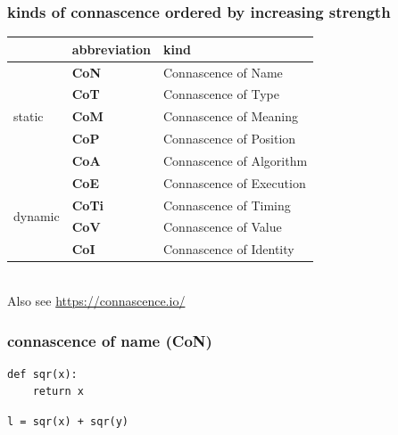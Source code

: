 \documentclass[aspectratio=169,12pt,xcolor=dvipsnames]{beamer}
\begin{document}
\begin{frame}
  \frametitle{kinds of connascence ordered by increasing strength}
  \begin{center}
    \begin{tabular}{|l|l|l|}\hline
      & \textbf{abbreviation}  & \textbf{kind} \\\hline
      \multirow{5}{*}{static}  & \textbf{CoN}  & Connascence of Name\\
      & \textbf{CoT}  & Connascence of Type\\
      & \textbf{CoM}  & Connascence of Meaning\\
      & \textbf{CoP}  & Connascence of Position\\
      & \textbf{CoA}  & Connascence of Algorithm\\\hline
      \multirow{4}{*}{dynamic} & \textbf{CoE}  & Connascence of Execution\\
      & \textbf{CoTi} & Connascence of Timing\\
      & \textbf{CoV}  & Connascence of Value\\
      & \textbf{CoI}  & Connascence of Identity\\\hline
    \end{tabular}\\\bigskip
    Also see \url{https://connascence.io/}
  \end{center}
\end{frame}

\begin{frame}[fragile]
  \frametitle{connascence of name (CoN)}
  \begin{center}
    \begin{minipage}[c]{.35\textwidth}
      \begin{verbatim}
def sqr(x):
    return x
      \end{verbatim}
    \end{minipage}
    \begin{minipage}[c]{.35\textwidth}
      \begin{verbatim}
l = sqr(x) + sqr(y)
      \end{verbatim}
    \end{minipage}
  \end{center}
\end{frame}
\end{document}
